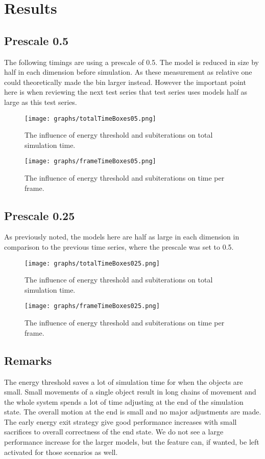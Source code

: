 \section{Results}
\subsection{Prescale 0.5}
The following timings are using a prescale of 0.5. The model is reduced in size by
half in each dimension before simulation. As these measurement as relative one could
theoretically made the bin larger instead. However the important point here is when reviewing the
next test series that test series uses models half as large as this test series.
\begin{figure}[H]
  \centering
  \texttt{[image: graphs/totalTimeBoxes05.png]}
  \caption{The influence of energy threshold and subiterations on total simulation time.}
  \label{fig:totalTimeBoxes05}
\end{figure}

\begin{figure}[H]
  \centering
  \texttt{[image: graphs/frameTimeBoxes05.png]}
  \caption{The influence of energy threshold and subiterations on time per frame.}
  \label{fig:frameTimeBoxes05}
\end{figure}

\subsection{Prescale 0.25}
As previously noted, the models here are half as large in each dimension in comparison to
the previous time series, where the prescale was set to 0.5.
\begin{figure}[H]
  \centering
  \texttt{[image: graphs/totalTimeBoxes025.png]}
  \caption{The influence of energy threshold and subiterations on total simulation time.}
  \label{fig:totalTimeBoxes025}
\end{figure}

\begin{figure}[H]
  \centering
  \texttt{[image: graphs/frameTimeBoxes025.png]}
  \caption{The influence of energy threshold and subiterations on time per frame.}
  \label{fig:frameTimeBoxes025}
\end{figure}

\newpage
\subsection{Remarks}
The energy threshold saves a lot of simulation time for when the objects are small.
Small movements of a single object result in long chains of movement and the whole
system spends a lot of time adjusting at the end of the simulation state. The overall
motion at the end is small and no major adjustments are made. The early energy exit
strategy give good performance increases with small sacrifices to overall correctness
of the end state. We do not see a large performance increase for the larger models,
but the feature can, if wanted, be left activated for those scenarios as well.

